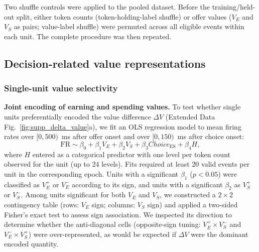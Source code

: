 \documentclass[pdflatex,sn-mathphys-num]{sn-jnl}%
\begin{document}
Two shuffle controls were applied to the pooled dataset. Before the training/held-out split, either token counts (token-holding-label shuffle) or offer values ($V_E$ and $V_S$ as pairs; value-label shuffle) were permuted across all eligible events within each unit. The complete procedure was then repeated.

\subsection{Decision-related value representations}

\subsubsection{Single-unit value selectivity}\label{sec:m_unit}
\textbf{Joint encoding of earning and spending values.} To test whether single units preferentially encoded the value difference $\Delta V$ (Extended Data Fig.~\ref{fig:supp_delta_value}a), we fit an OLS regression model to mean firing rates over $[0,500)$~ms after offer onset and over $[0,150)$~ms after choice onset:
\begin{equation}
    \mathrm{FR} \sim \beta_0 + \beta_1 V_E + \beta_2 V_S + \beta_3 \mathit{Choice}_{\mathrm{ES}} + \beta_4 H,
\end{equation}
where $H$ entered as a categorical predictor with one level per token count observed for the unit (up to 24 levels). Fits required at least 20 valid events per unit in the corresponding epoch. Units with a significant $\beta_1$ ($p<0.05$) were classified as $V_E^{+}$ or $V_E^{-}$ according to its sign, and units with a significant $\beta_2$ as $V_S^{+}$ or $V_S^{-}$. Among units significant for both $V_E$ and $V_S$, we constructed a $2 \times 2$ contingency table (rows: $V_E$ sign; columns: $V_S$ sign) and applied a two-sided Fisher's exact test to assess sign association. We inspected its direction to determine whether the anti-diagonal cells (opposite-sign tuning: $V_E^{+}\times V_S^{-}$ and $V_E^{-}\times V_S^{+}$) were over-represented, as would be expected if $\Delta V$ were the dominant encoded quantity.
\end{document}
